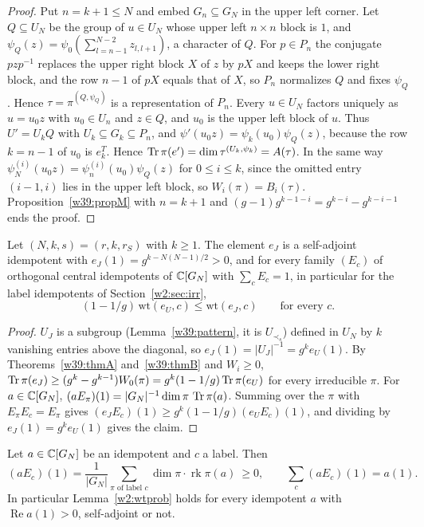\begin{proof}
Put $n=k+1\le N$ and embed $G_n\subseteq G_N$ in the upper left corner. Let $Q\subseteq U_N$ be the group of $u\in U_N$ whose upper left $n\times n$ block is $1$, and $\psi_Q(z)=\psi_0(\sum_{l=n-1}^{N-2}z_{l,l+1})$, a character of $Q$. For $p\in P_n$ the conjugate $pzp^{-1}$ replaces the upper right block $X$ of $z$ by $pX$ and keeps the lower right block, and the row $n-1$ of $pX$ equals that of $X$, so $P_n$ normalizes $Q$ and fixes $\psi_Q$. Hence $\tau=\pi^{(Q,\psi_Q)}$ is a representation of $P_n$. Every $u\in U_N$ factors uniquely as $u=u_0z$ with $u_0\in U_n$ and $z\in Q$, and $u_0$ is the upper left block of $u$. Thus $U'=U_kQ$ with $U_k\subseteq G_k\subseteq P_n$, and $\psi'(u_0z)=\psi_k(u_0)\psi_Q(z)$, because the row $k=n-1$ of $u_0$ is $e_k^T$. Hence $\operatorname{Tr}\pi(e')=\dim\tau^{(U_k,\psi_k)}=A(\tau)$. In the same way $\psi^{(i)}_N(u_0z)=\psi^{(i)}_n(u_0)\psi_Q(z)$ for $0\le i\le k$, since the omitted entry $(i-1,i)$ lies in the upper left block, so $W_i(\pi)=B_i(\tau)$. Proposition~\ref{w39:propM} with $n=k+1$ and $(g-1)g^{k-1-i}=g^{k-i}-g^{k-i-1}$ ends the proof.
\end{proof}

\begin{corollary}\label{w39:Hwt}\label{w2x:idem}\label{w2x:cmp}
Let $(N,k,s)=(r,k,r_S)$ with $k\ge1$. The element $e_J$ is a self-adjoint idempotent with $e_J(1)=g^{k-N(N-1)/2}>0$, and for every family $(E_c)$ of orthogonal central idempotents of $\mathbb C[G_N]$ with $\sum_cE_c=1$, in particular for the label idempotents of Section~\ref{w2:sec:irr},
\[
(1-1/g)\,\mathrm{wt}(e_U,c)\le\mathrm{wt}(e_J,c)\qquad\text{for every }c.
\]
\end{corollary}

\begin{proof}
$U_J$ is a subgroup (Lemma~\ref{w39:pattern}, it is $U_{\prec_s}$) defined in $U_N$ by $k$ vanishing entries above the diagonal, so $e_J(1)=\lvert U_J\rvert^{-1}=g^ke_U(1)$. By Theorems~\ref{w39:thmA} and~\ref{w39:thmB} and $W_i\ge0$, $\operatorname{Tr}\pi(e_J)\ge(g^k-g^{k-1})W_0(\pi)=g^k(1-1/g)\operatorname{Tr}\pi(e_U)$ for every irreducible $\pi$. For $a\in\mathbb C[G_N]$, $(aE_\pi)(1)=\lvert G_N\rvert^{-1}\dim\pi\,\operatorname{Tr}\pi(a)$. Summing over the $\pi$ with $E_\pi E_c=E_\pi$ gives $(e_JE_c)(1)\ge g^k(1-1/g)(e_UE_c)(1)$, and dividing by $e_J(1)=g^ke_U(1)$ gives the claim.
\end{proof}

\begin{lemma}\label{w2x:trace}
Let $a\in\mathbb C[G_N]$ be an idempotent and $c$ a label. Then
\[
(aE_c)(1)=\frac1{\lvert G_N\rvert}\sum_{\pi\text{ of label }c}\dim\pi\cdot\operatorname{rk}\pi(a)\ \ge0,\qquad\sum_c(aE_c)(1)=a(1).
\]
In particular Lemma~\ref{w2:wtprob} holds for every idempotent $a$ with $\operatorname{Re}a(1)>0$, self-adjoint or not.
\end{lemma}

